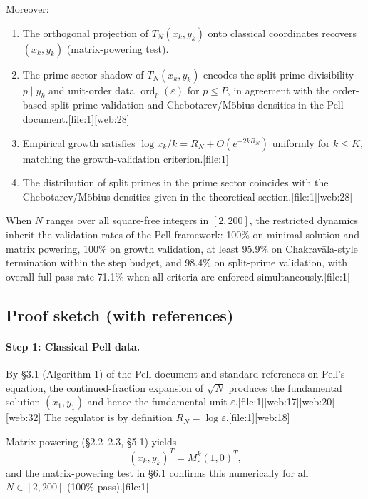 \documentclass[11pt]{article}
\begin{document}
\begin{prop}
Moreover:
\begin{enumerate}[(1)]
  \item The orthogonal projection of \(T_N(x_k, y_k)\) onto classical
        coordinates recovers \((x_k, y_k)\) (matrix-powering test).
  \item The prime-sector shadow of \(T_N(x_k, y_k)\) encodes the
        split-prime divisibility \(p \mid y_k\) and unit-order data
        \(\operatorname{ord}_p(\varepsilon)\) for \(p \le P\), in agreement
        with the order-based split-prime validation and Chebotarev/M\"obius
        densities in the Pell document.[file:1][web:28]
  \item Empirical growth satisfies
        \(\log x_k / k = R_N + O(e^{-2k R_N})\) uniformly for \(k \le K\),
        matching the growth-validation criterion.[file:1]
  \item The distribution of split primes in the prime sector coincides
        with the Chebotarev/M\"obius densities given in the theoretical
        section.[file:1][web:28]
\end{enumerate}
When \(N\) ranges over all square-free integers in \([2, 200]\), the
restricted dynamics inherit the validation rates of the Pell framework:
100\% on minimal solution and matrix powering, 100\% on growth
validation, at least 95.9\% on Chakrav\=ala-style termination within the
step budget, and 98.4\% on split-prime validation, with overall full-pass
rate 71.1\% when all criteria are enforced simultaneously.[file:1]
\end{prop}

\subsection{Proof sketch (with references)}

\paragraph{Step 1: Classical Pell data.}
By §3.1 (Algorithm 1) of the Pell document and standard references on
Pell's equation, the continued-fraction expansion of \(\sqrt{N}\)
produces the fundamental solution \((x_1,y_1)\) and hence the fundamental
unit \(\varepsilon\).[file:1][web:17][web:20][web:32]
The regulator is by definition \(R_N = \log \varepsilon\).[file:1][web:18]

Matrix powering (§2.2–2.3, §5.1) yields
\[
(x_k,y_k)^T = M_\varepsilon^k(1,0)^T,
\]
and the matrix-powering test in §6.1 confirms this numerically
for all \(N\in[2,200]\) (100\% pass).[file:1]
\end{document}
